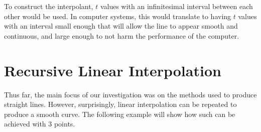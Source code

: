 \documentclass[11pt, oneside, appendixprefix=Appendix]{article}
\theoremstyle{definition}
\numberwithin{figure}{section}
\begin{document}
To construct the interpolant, $t$ values with an infinitesimal interval between each other would be used. In computer systems, this would translate to having $t$ values with an interval small enough that will allow the line to appear smooth and continuous, and large enough to not harm the performance of the computer.

\section{Recursive Linear Interpolation}

Thus far, the main focus of our investigation was on the methods used to produce straight lines. However, surprisingly, linear interpolation can be repeated to produce a smooth curve. The following example will show how such can be achieved with 3 points.
\end{document}
